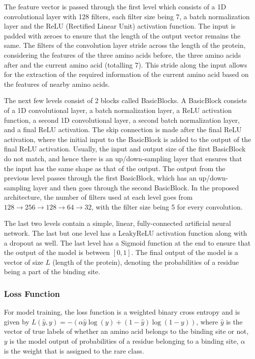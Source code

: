 \documentclass[journal=jacsat,manuscript=article]{achemso}
\begin{document}
The feature vector is passed through the first level which consists of a 1D convolutional layer with 128 filters, each filter size being 7, a batch normalization layer and the ReLU (Rectified Linear Unit) activation function. The input is padded with zeroes to ensure that the length of the output vector remains the same. The filters of the convolution layer stride across the length of the protein, considering the features of the three amino acids before, the three amino acids after and the current amino acid (totalling 7). This stride along the input allows for the extraction of the required information of the current amino acid based on the features of nearby amino acids.

The next few levels consist of 2 blocks called BasicBlocks. A BasicBlock consists of a 1D convolutional layer, a batch normalization layer, a ReLU activation function, a second 1D convolutional layer, a second batch normalization layer, and a final ReLU activation. The skip connection is made after the final ReLU activation, where the initial input to the BasicBlock is added to the output of the final ReLU activation. Usually, the input and output size of the first BasicBlock do not match, and hence there is an up/down-sampling layer that ensures that the input has the same shape as that of the output. The output from the previous level passes through the first BasicBlock, which has an up/down-sampling layer and then goes through the second BasicBlock. In the proposed architecture, the number of filters used at each level goes from $128 \to 256 \to 128 \to 64 \to 32$, with the filter size being 5 for every convolution.

The last two levels contain a simple, linear, fully-connected artificial neural network. The last but one level has a LeakyReLU activation function along with a dropout as well. The last level has a Sigmoid function at the end to ensure that the output of the model is between $[0, 1]$. The final output of the model is a vector of size $L$ (length of the protein), denoting the probabilities of a residue being a part of the binding site.

\subsubsection{Loss Function}
\quad For model training, the loss function is a weighted binary cross entropy and is given by
$L(\hat{y}, y) = -(\alpha\hat{y}\log(y) + (1-\hat{y})\log(1-y))$, where $\hat{y}$ is the vector of true labels of whether an amino acid belongs to the binding site or not, $y$ is the model output of probabilities of a residue belonging to a binding site, $\alpha$ is the weight that is assigned to the rare class.
\end{document}
